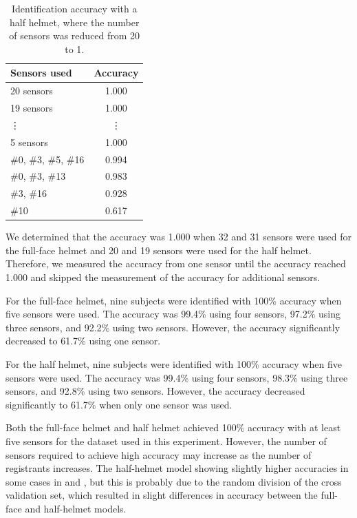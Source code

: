 \documentclass[english,preprint,JIP]{ipsj}
\begin{document}
\begin{table}[!t]
 \centering
  \caption{Identification accuracy with a half helmet, where the number of sensors was reduced from 20 to 1.}
    \label{tab:half_num}
  \begin{tabular}{l|c} \hline\hline
    Sensors used & Accuracy \\ \hline
    20 sensors & 1.000 \\
    19 sensors & 1.000 \\
    \vdots & \vdots \\
    5 sensors & 1.000 \\
    $\#$0, $\#$3, $\#$5, $\#$16 & 0.994 \\
    $\#$0, $\#$3, $\#$13        & 0.983 \\
    $\#$3, $\#$16               & 0.928 \\
    $\#$10                      & 0.617 \\ \hline
  \end{tabular}
\end{table}

We determined that the accuracy was 1.000 when 32 and 31 sensors were used for the full-face helmet and 20 and 19 sensors were used for the half helmet. Therefore, we measured the accuracy from one sensor until the accuracy reached 1.000 and skipped the measurement of the accuracy for additional sensors.\par

For the full-face helmet, nine subjects were identified with 100\% accuracy when five sensors were used. The accuracy was 99.4\% using four sensors, 97.2\% using three sensors, and 92.2\% using two sensors. However, the accuracy significantly decreased to 61.7\% using one sensor.\par

For the half helmet, nine subjects were identified with 100\% accuracy when five sensors were used. The accuracy was 99.4\% using four sensors, 98.3\% using three sensors, and 92.8\% using two sensors. However, the accuracy decreased significantly to 61.7\% when only one sensor was used.\par

Both the full-face helmet and half helmet achieved 100\% accuracy with at least five sensors for the dataset used in this experiment. However, the number of sensors required to achieve high accuracy may increase as the number of registrants increases. The half-helmet model showing slightly higher accuracies in some cases in  and , but this is probably due to the random division of the cross validation set, which resulted in slight differences in accuracy between the full-face and half-helmet models.\par
\end{document}
